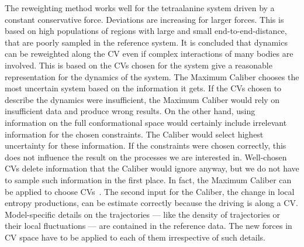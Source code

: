  The reweighting method works well for the tetraalanine system driven by a constant conservative force. Deviations are increasing for larger forces. This is based on high populations of regions with large and small end-to-end-distance, that are poorly sampled in the reference system. It is concluded that dynamics can be reweighted along the CV even if complex interactions of many bodies are involved.  This is based on the CVs chosen for the system give a reasonable representation for the dynamics of the system. The Maximum Caliber chooses the most uncertain system based on the information it gets. If the CVs chosen to describe the dynamics were insufficient, the Maximum Caliber would rely on insufficient data and produce wrong results. On the other hand, using information on the full conformational space would certainly include  irrelevant information for the chosen constraints. The Caliber would select highest uncertainty for these information. If the constraints were chosen correctly, this does not influence the result on the processes we are interested in. Well-chosen CVs delete information that the Caliber would ignore anyway, but we do not have to sample such information in the first place. In fact, the Maximum Caliber can be applied to choose CVs~\cite{smith2018multi,tiwary2016spectral}. The second input for the Caliber, the change in local entropy productions, can be estimate correctly because the driving is along a CV. Model-specific details on the trajectories --- like the density of trajectories or their local fluctuations --- are contained in the reference data. The new forces in CV space have to be applied to each of them irrespective of such details. 

\FloatBarrier
